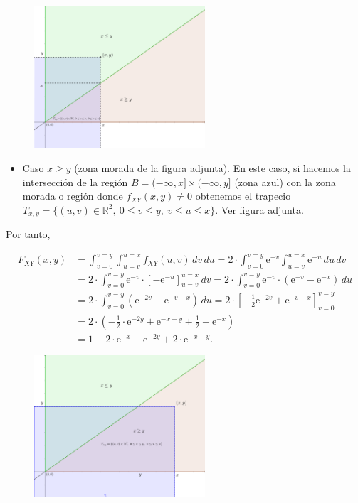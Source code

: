 \documentclass[]{book}
\providecommand{\tightlist}{%
  \setlength{\itemsep}{0pt}\setlength{\parskip}{0pt}}
\begin{document}
\begin{figure}
\includegraphics[width=2.5in]{Images/Ejemplo2Bidi3} \end{figure}

\begin{itemize}
\tightlist
\item
  Caso \(x\geq y\) (zona morada de la figura adjunta). En este caso, si hacemos la intersección de la región \(B=(-\infty,x]\times (-\infty,y]\) (zona azul) con la zona morada o región donde \(f_{XY}(x,y)\neq 0\) obtenemos el trapecio \(T_{x,y}=\{(u,v)\in\mathbb{R}^2,\ 0\leq v\leq y,\ v\leq u\leq x\}.\) Ver figura adjunta.
\end{itemize}

Por tanto,

\[
\begin{array}{rl}
F_{XY}(x,y) &=  \int_{v=0}^{v=y}\int_{u=v}^{u=x} f_{XY}(u,v)\,dv\,du= 2\cdot\int_{v=0}^{v=y} \mathrm{e}^{-v}\int_{u=v}^{u=x} \mathrm{e}^{-u}\,du\,dv \\
&=  2 \cdot\int_{v=0}^{v=y} \mathrm{e}^{-v}\cdot\left[-\mathrm{e}^{-u}\right]_{u=v}^{u=x}\, dv  = 2 \cdot\int_{v=0}^{v=y} \mathrm{e}^{-v}\cdot (\mathrm{e}^{-v}-\mathrm{e}^{-x})\, du \\ 
&=  2 \cdot\int_{v=0}^{v=y} \left(\mathrm{e}^{-2v}-\mathrm{e}^{-v-x}\right)\, du=2 \cdot\left[-\frac{1}{2}\mathrm{e}^{-2v}+\mathrm{e}^{-v-x}\right]_{v=0}^{v=y}  
\\ &=  2\cdot\left(-\frac{1}{2}\cdot\mathrm{e}^{-2y}+\mathrm{e}^{-x-y}+\frac{1}{2}-\mathrm{e}^{-x}\right) \\&=  1-2\cdot\mathrm{e}^{-x}-\mathrm{e}^{-2y}+2\cdot\mathrm{e}^{-x-y}.
\end{array}
\]

\begin{figure}
\includegraphics[width=2.5in]{Images/Ejemplo2Bidi4} \end{figure}
\end{document}
